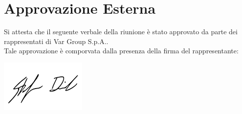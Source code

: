 \section{Approvazione Esterna}
Si attesta che il seguente verbale della riunione è stato approvato da parte dei rappresentati di Var Group S.p.A..\\
Tale approvazione è comporvata dalla presenza della firma del rappresentante:\\
\begin{flushright}
	\vfill
	\includegraphics{2025-10-27_firma}
\end{flushright}

